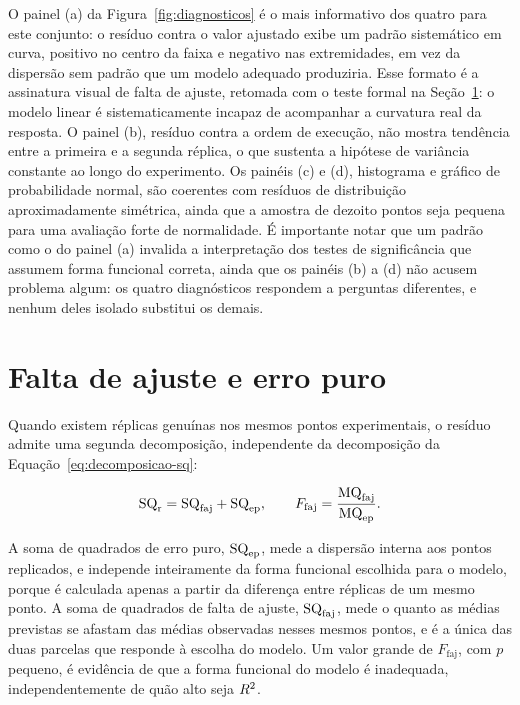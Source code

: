 \documentclass{doeapostila}
\begin{document}
O painel (a) da Figura~\ref{fig:diagnosticos} é o mais informativo dos
quatro para este conjunto: o resíduo contra o valor ajustado exibe um
padrão sistemático em curva, positivo no centro da faixa e negativo nas
extremidades, em vez da dispersão sem padrão que um modelo adequado
produziria. Esse formato é a assinatura visual de falta de ajuste,
retomada com o teste formal na Seção~\ref{sec:falta-de-ajuste}: o modelo
linear é sistematicamente incapaz de acompanhar a curvatura real da
resposta. O painel (b), resíduo contra a ordem de execução, não mostra
tendência entre a primeira e a segunda réplica, o que sustenta a hipótese
de variância constante ao longo do experimento. Os painéis (c) e (d),
histograma e gráfico de probabilidade normal, são coerentes com resíduos
de distribuição aproximadamente simétrica, ainda que a amostra de dezoito
pontos seja pequena para uma avaliação forte de normalidade. É importante
notar que um padrão como o do painel (a) invalida a interpretação dos
testes de significância que assumem forma funcional correta, ainda que os
painéis (b) a (d) não acusem problema algum: os quatro diagnósticos
respondem a perguntas diferentes, e nenhum deles isolado substitui os
demais.

\section{Falta de ajuste e erro puro}
\label{sec:falta-de-ajuste}

Quando existem réplicas genuínas nos mesmos pontos experimentais, o resíduo
admite uma segunda decomposição, independente da decomposição da
Equação~\eqref{eq:decomposicao-sq}:

\begin{equation}
  \mathrm{SQ}_{\mathrm{r}} = \mathrm{SQ}_{\mathrm{faj}} + \mathrm{SQ}_{\mathrm{ep}} , \qquad
  F_{\mathrm{faj}} = \frac{\mathrm{MQ}_{\mathrm{faj}}}{\mathrm{MQ}_{\mathrm{ep}}} .
  \label{eq:falta-ajuste}
\end{equation}

A soma de quadrados de erro puro, $\mathrm{SQ}_{\mathrm{ep}}$, mede a dispersão interna aos
pontos replicados, e independe inteiramente da forma funcional escolhida
para o modelo, porque é calculada apenas a partir da diferença entre
réplicas de um mesmo ponto. A soma de quadrados de falta de ajuste,
$\mathrm{SQ}_{\mathrm{faj}}$, mede o quanto as médias previstas se afastam das médias
observadas nesses mesmos pontos, e é a única das duas parcelas que
responde à escolha do modelo. Um valor grande de $F_{\mathrm{faj}}$, com
$p$ pequeno, é evidência de que a forma funcional do modelo é inadequada,
independentemente de quão alto seja $R^{2}$.
\end{document}
